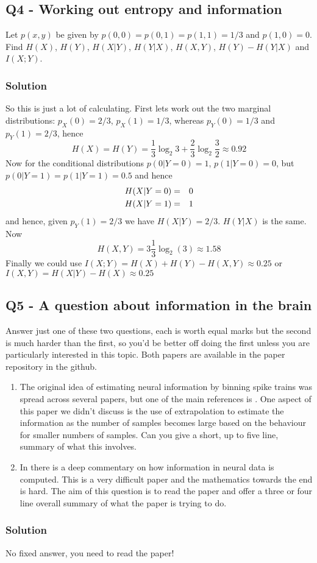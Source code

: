 \documentclass[12pt]{article}
\begin{document}
\subsection*{Q4 - Working out entropy and information}

Let $p(x,y)$ be given by $p(0,0)=p(0,1)=p(1,1)=1/3$ and
$p(1,0)=0$. Find $H(X)$, $H(Y)$, $H(X|Y)$, $H(Y|X)$, $H(X,Y)$,
$H(Y)-H(Y|X)$ and $I(X;Y)$.

\subsubsection*{Solution}

So this is just a lot of calculating. First lets work out the two marginal distributions: $p_X(0)=2/3$, $p_X(1)=1/3$, whereas $p_Y(0)=1/3$ and $p_Y(1)=2/3$, hence
\begin{equation}
  H(X)=H(Y)=\frac{1}{3}\log_2{3}+\frac{2}{3}\log_2{\frac{3}{2}}\approx 0.92
\end{equation}
Now for the conditional distributions $p(0|Y=0)=1$, $p(1|Y=0)=0$, but $p(0|Y=1)=p(1|Y=1)=0.5$ and hence
\begin{eqnarray}
  H(X|Y=0)&=&0\cr
  H(X|Y=1)&=&1
\end{eqnarray}
and hence, given $p_Y(1)=2/3$ we have $H(X|Y)=2/3$. $H(Y|X)$ is the same. Now
\begin{equation}
  H(X,Y)=3\frac{1}{3}\log_2(3)\approx 1.58
\end{equation}
Finally we could use $I(X;Y)=H(X)+H(Y)-H(X,Y)\approx 0.25$ or $I(X,Y)=H(X|Y)-H(X)\approx 0.25$ 


\subsection*{Q5 - A question about information in the brain}

Answer just one of these two questions, each is worth equal marks but the
second is much harder than the first, so you'd be better off doing the
first unless you are particularly interested in this topic. Both papers are available in the paper repository in the github.

\begin{enumerate}
\item The original idea of estimating neural information by binning
  spike trains was spread across several papers, but one of the main
  references is \cite{StrongEtAl1998}. One aspect of this paper we
  didn't discuss is the use of extrapolation to estimate the
  information as the number of samples becomes large based on the
  behaviour for smaller numbers of samples. Can you give a short, up
  to five line, summary of what this involves.

\item In \cite{NemenmanEtAl2004} there is a deep commentary on how
  information in neural data is computed. This is a very difficult
  paper and the mathematics towards the end is hard. The aim of this
  question is to read the paper and offer a three or four line overall
  summary of what the paper is trying to do.
\end{enumerate}

\subsubsection*{Solution}

No fixed answer, you need to read the paper!


{}
\end{document}

